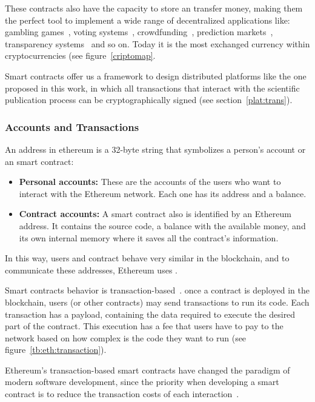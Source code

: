 These contracts also have the capacity to store an transfer money, making them
the perfect tool to implement a wide range of decentralized applications like:
gambling games~\cite{piasecki2016gaming}, voting
systems~\cite{mccorry2017smart}, crowdfunding~\cite{jacynycz2016betfunding},
prediction markets~\cite{peterson2015augur}, transparency
systems~\cite{bonneau2016ethiks} and so on. Today it is the most exchanged
currency within cryptocurrencies (see figure~\ref{criptomap}.

Smart contracts offer us a framework to design distributed platforms like the
one proposed in this work, in which all transactions that interact with the
scientific publication process can be cryptographically signed (see
section~\ref{plat:trans}).

\subsubsection*{Accounts and Transactions}
\label{ts:at}
An address in ethereum is a 32-byte string that symbolizes a person's account or
an smart contract:
\begin{itemize}
\item \textbf{Personal accounts:} These are the accounts of the users who want
  to interact with the Ethereum network. Each one has its address and a balance.
\item \textbf{Contract accounts:} A smart contract also is identified by an
  Ethereum address. It contains the source code, a balance with the available
  money, and its own internal memory where it saves all the contract's
  information.
\end{itemize}

In this way, users and contract behave very similar in the blockchain, and to
communicate these addresses, Ethereum uses .


Smart contracts behavior is transaction-based~\cite{wood2014ethereum}. once a
contract is deployed in the blockchain, users (or other contracts) may send
transactions to run its code. Each transaction has a payload, containing the
data required to execute the desired part of the contract. This execution has a
fee that users have to pay to the network based on how complex is the code they
want to run (see figure~\ref{tb:eth:transaction}).

Ethereum's transaction-based smart contracts have changed the paradigm of modern
software development, since the priority when developing a smart contract is to
reduce the transaction costs of each interaction~\cite{delmolino2016step}.


